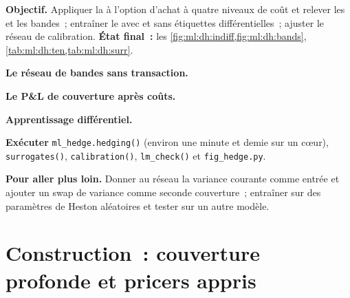 \begin{tutorial}
\textbf{Objectif.} Appliquer la  à l'option d'achat à quatre niveaux de coût et relever les  et les bandes~; entraîner le  avec
et sans étiquettes différentielles~; ajuster le réseau de calibration. \textbf{État final~:}
les \cref{fig:ml:dh:indiff,fig:ml:dh:bands}, \cref{tab:ml:dh:ten,tab:ml:dh:surr}.
\begin{tutsteps}
\item \textbf{Le réseau de bandes sans transaction.}
\label{lst:ml:dh:band}
\item \textbf{Le P\&L de couverture après coûts.}
\label{lst:ml:dh:pnl}
\item \textbf{Apprentissage différentiel.}
\label{lst:ml:dh:surr}
\item \textbf{Exécuter} \texttt{ml\_hedge.hedging()} (environ une minute et demie sur un cœur), \texttt{surrogates()},
\texttt{calibration()}, \texttt{lm\_check()} et \texttt{fig\_hedge.py}.
\end{tutsteps}
\textbf{Pour aller plus loin.} Donner au réseau la variance courante comme entrée et ajouter un swap de variance comme seconde couverture~;
entraîner sur des paramètres de Heston aléatoires et tester sur un autre modèle.
\end{tutorial}

\section{Construction~: couverture profonde et pricers appris}\label{bld:ml:deep-hedging-and-machine-learning-in-pricing:deephedge}

